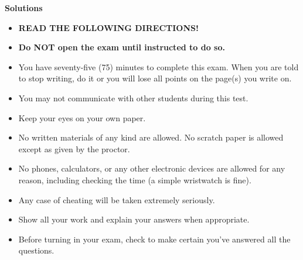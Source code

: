 \documentclass[addpoints,10pt]{exam}
\begin{document}
\ifprintanswers
\begin{center}
	\textbf{Solutions}
\end{center}
\else
\vspace*{1em}

\vspace{20pt}

\begin{itemize}
\item \textbf{READ THE FOLLOWING DIRECTIONS!}
\item \textbf{Do NOT open the exam until instructed to do so.}
\end{itemize}
\begin{itemize}
\item You have 
seventy-five (75) minutes
%
to complete this exam.  When you are told to stop writing, do it or you will lose all points on the page(s) you write on.
\item You may not communicate with other students during this test.
\item Keep your eyes on your own paper.
\item No written materials of any kind are allowed.  No scratch paper is allowed except as given by the proctor.
\item No phones, calculators, or any other electronic devices are allowed for any reason, including checking the time (a simple wristwatch is fine).
\item Any case of cheating will be taken extremely seriously.

\bigskip

\item Show all your work and explain your answers when appropriate.
\item Before turning in your exam, check to make certain you've answered all the questions.

\bigskip


\end{itemize}

\vfill

\begin{center}
\gradetable[h][questions]
\end{center}
\end{document}

